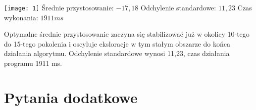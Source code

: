 \documentclass[11pt]{article}
\begin{document}
\texttt{[image: 1]}\newline
Średnie przystosowanie: $-17,18$\newline
Odchylenie standardowe: $11,23$\newline
Czas wykonania: $1911 ms$\newline

Optymalne średnie przystosowanie zaczyna się stabilizować
już w okolicy 10-tego do 15-tego pokolenia i oscyluje 
eksloracje w tym stałym obszarze do końca działania algorytmu.
Odchylenie standardowe wynosi 11,23, czas działania 
programu 1911 ms.
 
\section{Pytania dodatkowe}
\end{document}
